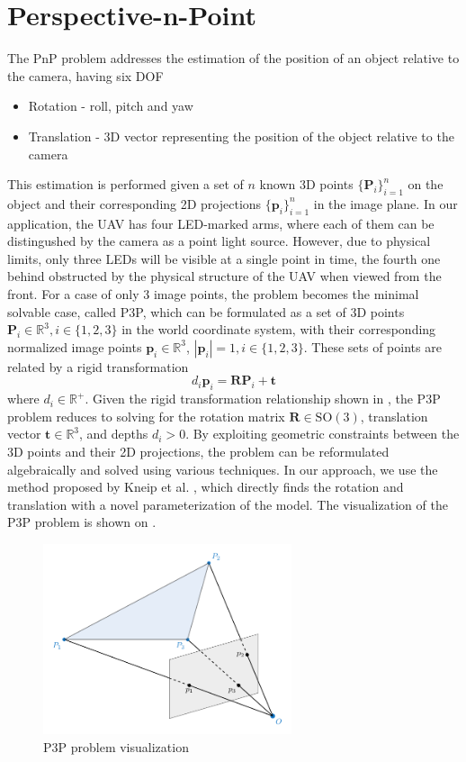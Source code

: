 \section{Perspective-n-Point}
The \ac{PnP} problem addresses the estimation of the position of an object relative to the camera, having six \ac{DOF}
\begin{itemize}
\item{Rotation - roll, pitch and yaw}
\item{Translation - 3D vector representing the position of the object relative to the camera}
\end{itemize}
This estimation is performed given a set of $n$ known 3D points $\{\mathbf{P}_i\}_{i=1}^n$ on the object and their corresponding 2D projections $\{\mathbf{p}_i\}_{i=1}^n$ in the image plane.
In our application, the UAV has four \ac{LED}-marked arms, where each of them can be distingushed by the camera as a point light source.
However, due to physical limits, only three \ac{LED}s will be visible at a single point in time, the fourth one behind obstructed by the physical structure of the \ac{UAV} when viewed from the front.
For a case of only 3 image points, the problem becomes the minimal solvable case, called \ac{P3P}, which 
can be formulated as a set of 3D points $\textbf{P}_i \in \mathbb{R}^{3}, i \in \{1, 2, 3\}$ in the world coordinate system, with their corresponding normalized image points
$\textbf{p}_i \in \mathbb{R}^{3}$, $|\textbf{p}_i|=1, i \in \{1, 2, 3\}$. These sets of points are related by a rigid transformation \cite{Ding_2023_CVPR}
\begin{equation}
d_i \textbf{p}_i = \textbf{R} \textbf{P}_i + \textbf{t}
\label{eq:p3p}
\end{equation}
where $d_i \in \mathbb{R}^+$.
Given the rigid transformation relationship shown in , the \ac{P3P} problem reduces to solving for the rotation matrix 
$\mathbf{R} \in \text{SO}(3)$, translation vector $\mathbf{t} \in \mathbb{R}^3$, and depths $d_i > 0$. 
By exploiting geometric constraints between the 3D points and their 2D projections, the problem can be
reformulated algebraically and solved using various techniques. In our approach, we use the method proposed by Kneip et al. \cite{kneip}, which
directly finds the rotation and translation with a novel parameterization of the model.
The visualization of the \ac{P3P} problem is shown on .
\begin{figure}[H]
	\centering
	\includegraphics[width=0.65\textwidth]{./fig/tikz/p3p.pdf}
	\caption{P3P problem visualization}
	\label{fig:p3p}
\end{figure}
